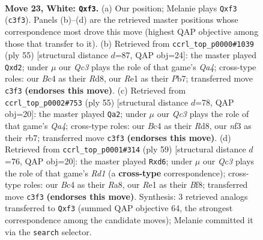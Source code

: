 \documentclass[11pt]{article}
\begin{document}
\clearpage

\begin{figure}[p]\centering
\begin{subfigure}{0.46\textwidth}\centering
\resizebox{\linewidth}{!}{%
\newchessgame
\chessboard[
  setfen={4r1k1/pp5p/3bpqp1/8/2B5/2Q2nP1/PP3P1P/R3R1K1 w - - 1 23},
  showmover=false,
  pgfstyle=straightmove, color=movearrow, markmove={c3-f3}
]}
\caption{}
\end{subfigure}\hfill
\begin{subfigure}{0.46\textwidth}\centering
\resizebox{\linewidth}{!}{%
\newchessgame
\chessboard[
  setfen={3rr1k1/1p3pp1/p6p/q2P4/P1R5/7P/3Q1PP1/3R2K1 b - - 4 28},
  showmover=false,
  pgfstyle=straightmove, color=movearrow, markmove={a5-d2}
]}
\caption{}
\end{subfigure}
\\[4pt]
\begin{subfigure}{0.46\textwidth}\centering
\resizebox{\linewidth}{!}{%
\newchessgame
\chessboard[
  setfen={3r1rk1/1R3p1p/p5p1/q3p3/2PN2nP/3Q4/3B1PP1/2R3K1 b - - 1 28},
  showmover=false,
  pgfstyle=straightmove, color=movearrow, markmove={a5-a2}
]}
\caption{}
\end{subfigure}\hfill
\begin{subfigure}{0.46\textwidth}\centering
\resizebox{\linewidth}{!}{%
\newchessgame
\chessboard[
  setfen={r2r1bk1/1R3p1p/3Bp1p1/PQ2N3/1p1pq3/6PP/5P2/R5K1 b - - 0 30},
  showmover=false,
  pgfstyle=straightmove, color=movearrow, markmove={d8-d6}
]}
\caption{}
\end{subfigure}
\caption{\textbf{Move 23, White: \texttt{Qxf3}.} (a) Our position; Melanie plays \texttt{Qxf3} (\texttt{c3f3}). Panels (b)--(d) are the retrieved master positions whose correspondence most drove this move (highest QAP objective among those that transfer to it). (b) Retrieved from \texttt{ccrl\_top\_p0000\#1039} (ply 55) [structural distance $d$=87, QAP obj=24]: the master played \texttt{Qxd2}; under $\mu$ our \emph{Qc3} plays the role of that game's \emph{Qa4}; cross-type roles: our \emph{B}c4 as their \emph{R}d8, our \emph{R}e1 as their \emph{P}b7; transferred move \texttt{c3f3} \textbf{(endorses this move)}. (c) Retrieved from \texttt{ccrl\_top\_p0002\#753} (ply 55) [structural distance $d$=78, QAP obj=20]: the master played \texttt{Qa2}; under $\mu$ our \emph{Qc3} plays the role of that game's \emph{Qa4}; cross-type roles: our \emph{B}c4 as their \emph{R}d8, our \emph{n}f3 as their \emph{r}b7; transferred move \texttt{c3f3} \textbf{(endorses this move)}. (d) Retrieved from \texttt{ccrl\_top\_p0001\#314} (ply 59) [structural distance $d$=76, QAP obj=20]: the master played \texttt{Rxd6}; under $\mu$ our \emph{Qc3} plays the role of that game's \emph{Rd1} (a \textbf{cross-type} correspondence); cross-type roles: our \emph{B}c4 as their \emph{R}a8, our \emph{R}e1 as their \emph{B}f8; transferred move \texttt{c3f3} \textbf{(endorses this move)}. Synthesis: 3 retrieved analogs transferred to \texttt{Qxf3} (summed QAP objective 64, the strongest correspondence among the candidate moves); Melanie committed it via the \texttt{search} selector.}
\label{fig:thought-m44}
\end{figure}
\end{document}
